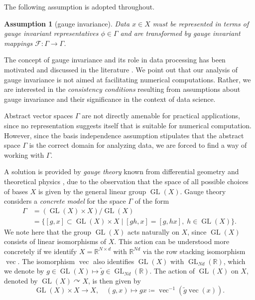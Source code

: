 \documentclass[10pt,reqno]{amsart}
\numberwithin{equation}{section}
\theoremstyle{bfnote}
\theoremstyle{bfdef}
\newtheorem{assumption}[theorem]{Assumption}
\newcommand{\mc}[1]{\mathcal{#1}}
\newcommand{\R}{\mathbb{R}}
\renewcommand\o\operatorname
\DeclareMathOperator{\GL}{GL}
\providecommand\x; %
\renewcommand{\x}{x}
\providecommand\X; %
\renewcommand{\X}{X}
\providecommand\XX; %
\renewcommand{\XX}{\Gamma}
\begin{document}
	The following assumption is adopted throughout.
	\begin{assumption}[gauge invariance]
		Data $\x \in \X$ must be represented in terms of gauge invariant representatives $\phi \in \XX$ and are transformed by gauge invariant mappings $\mc{F} : \XX \to \XX$.
	\end{assumption}
	The concept of gauge invariance and its role in data processing has been motivated and discussed in the literature \cite{batardHeatEquationsVector2011,weilerCoordinateIndependentConvolutional2021,gerkenGeometricDeepLearning2021}.
	We point out that our analysis of gauge invariance is not aimed at facilitating numerical computations. Rather, we are interested in the \textit{consistency conditions} resulting from assumptions about gauge invariance and their significance in the context of data science.

	Abstract vector spaces $\XX$ are not directly amenable for practical applications, since no representation suggests itself that is suitable for numerical computation. However, since the basis independence assumption stipulates that the abstract space $\XX$ is the correct domain for analyzing data, we are forced to find a way of working with $\XX$.
	
	A solution is provided by \textit{gauge theory} known from differential geometry and theoretical physics \cite{hamiltonMathematicalGaugeTheory2017}, due to the observation that the space of all possible choices of bases $\X$ is given by the general linear group $\GL(X)$. Gauge theory considers a \textit{concrete model} for the space $\XX$ of the form
	\begin{equation}\label{eq:smashed-prod}
		\begin{aligned}
			\XX
			&= (\GL(X) \times X) / \GL(X) \\
			&= \{ [g,\x ] \subset \GL(X) \times \X \mid [gh,\x ] = [g,hx] ,\; h \in \GL(X) \}.
		\end{aligned}
	\end{equation}
	We note here that the group $\GL(\X)$ acts naturally on $\X$, since $\GL(X)$ consists of linear isomorphisms of $X$. This action can be understood more concretely if we identify $X=\R^{N\times d}$ with $\R^{Nd}$ via the row stacking isomorphism $\o{vec}$. The isomorphism $\o{vec}$ also identifies $\GL(X)$ with $\GL_{Nd}(\R)$, which we denote by $g \in \GL(\X) \mapsto \tilde{g} \in \GL_{Nd}(\R)$. The action of $\GL(\X)$ on $\X$, denoted by $\GL(\X) \curvearrowright \X$, is then given by
	\begin{equation}\label{eq:action-glx}
		\GL(\X) \times \X \to \X, \quad (g,x) \mapsto gx \coloneqq \o{vec}^{-1}(\tilde{g}\o{vec}(x)).
	\end{equation}
\end{document}
